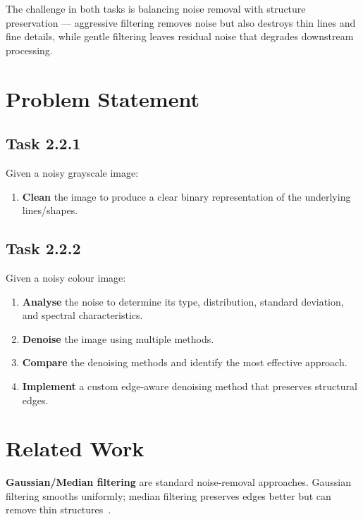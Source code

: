 \documentclass[conference, twocolumn]{IEEEtran}
\begin{document}
The challenge in both tasks is balancing noise removal with structure preservation --- aggressive filtering removes noise but also destroys thin lines and fine details, while gentle filtering leaves residual noise that degrades downstream processing.

\section{Problem Statement}

\subsection{Task 2.2.1}
Given a noisy grayscale image:
\begin{enumerate}
    \item \textbf{Clean} the image to produce a clear binary representation of the underlying lines/shapes.
\end{enumerate}

\subsection{Task 2.2.2}
Given a noisy colour image:
\begin{enumerate}
    \item \textbf{Analyse} the noise to determine its type, distribution, standard deviation, and spectral characteristics.
    \item \textbf{Denoise} the image using multiple methods.
    \item \textbf{Compare} the denoising methods and identify the most effective approach.
    \item \textbf{Implement} a custom edge-aware denoising method that preserves structural edges.
\end{enumerate}

\section{Related Work}

\textbf{Gaussian/Median filtering} are standard noise-removal approaches. Gaussian filtering smooths uniformly; median filtering preserves edges better but can remove thin structures~\cite{opencv}.
\end{document}
